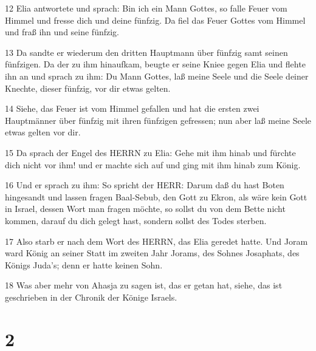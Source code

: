\par 12 Elia antwortete und sprach: Bin ich ein Mann Gottes, so falle Feuer vom Himmel und fresse dich und deine fünfzig. Da fiel das Feuer Gottes vom Himmel und fraß ihn und seine fünfzig.
\par 13 Da sandte er wiederum den dritten Hauptmann über fünfzig samt seinen fünfzigen. Da der zu ihm hinaufkam, beugte er seine Kniee gegen Elia und flehte ihn an und sprach zu ihm: Du Mann Gottes, laß meine Seele und die Seele deiner Knechte, dieser fünfzig, vor dir etwas gelten.
\par 14 Siehe, das Feuer ist vom Himmel gefallen und hat die ersten zwei Hauptmänner über fünfzig mit ihren fünfzigen gefressen; nun aber laß meine Seele etwas gelten vor dir.
\par 15 Da sprach der Engel des HERRN zu Elia: Gehe mit ihm hinab und fürchte dich nicht vor ihm! und er machte sich auf und ging mit ihm hinab zum König.
\par 16 Und er sprach zu ihm: So spricht der HERR: Darum daß du hast Boten hingesandt und lassen fragen Baal-Sebub, den Gott zu Ekron, als wäre kein Gott in Israel, dessen Wort man fragen möchte, so sollst du von dem Bette nicht kommen, darauf du dich gelegt hast, sondern sollst des Todes sterben.
\par 17 Also starb er nach dem Wort des HERRN, das Elia geredet hatte. Und Joram ward König an seiner Statt im zweiten Jahr Jorams, des Sohnes Josaphats, des Königs Juda's; denn er hatte keinen Sohn.
\par 18 Was aber mehr von Ahasja zu sagen ist, das er getan hat, siehe, das ist geschrieben in der Chronik der Könige Israels.

\chapter{2}

